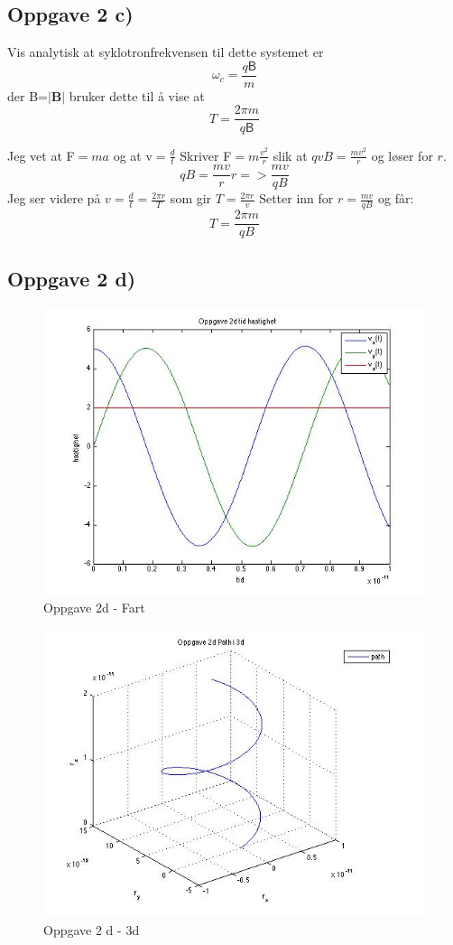 \documentclass[12pt,a4paper,final,leqno]{report}
\begin{document}
\subsection*{Oppgave 2 c)}
 Vis analytisk at syklotronfrekvensen til dette systemet er
 $$
 \omega_c=\frac{q\mathsf{B}}{m}
 $$
 der B=$|\mathbf{B}|$ bruker dette til å vise at
 $$
T=\frac{2\pi m}{q\mathsf{B}}
$$

Jeg vet at F$=ma$ og at v$=\frac{d}{t}$
Skriver F$=m\frac{v^2}{r}$ slik at $qvB=\frac{mv^2}{r}$ og løser for $r$.
$$
qB=\frac{mv}{r}r=>\frac{mv}{qB}
$$
Jeg ser videre på $v=\frac{d}{t}=\frac{2\pi r}{T}$ som gir $T=\frac{2\pi r}{v}$
Setter inn for $r=\frac{mv}{qB} $ og får:
$$
T=\frac{2\pi m}{qB}
$$

\subsection*{Oppgave 2 d)}


\begin{figure}[H]
\caption{Oppgave 2d - Fart}
\centering
\includegraphics[width=\textwidth]{oppgave2dvt.jpg}
\end{figure}

\begin{figure}[H]
\caption{Oppgave 2 d - 3d}
\centering
\includegraphics[width=\textwidth]{oppgave2d3d.jpg}
\end{figure}
\end{document}
